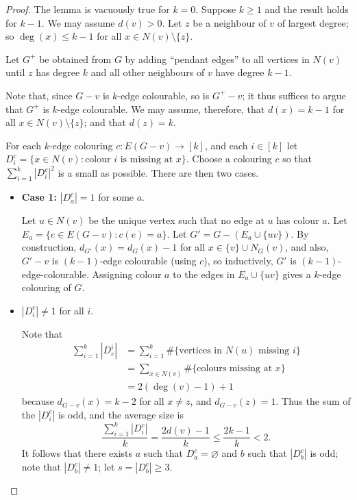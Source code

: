 \documentclass[main.tex]{subfiles}
\begin{document}
\begin{proof}
  The lemma is vacuously true for $k = 0$.
  Suppose $k\geq 1$ and the result holds for $k - 1$.
  We may assume $d(v) > 0$. Let $z$ be a neighbour of $v$ of largest degree;
  so $\deg(x)\leq k-1$ for all $x\in N(v)\setminus\{z\}$.

  Let $G^+$ be obtained from $G$ by adding ``pendant edges'' to all vertices
  in $N(v)$ until $z$ has degree $k$ and all other neighbours of $v$ have degree
  $k-1$.

  Note that, since $G - v$ is $k$-edge colourable, so is $G^+-v$;
  it thus suffices to argue that $G^+$ is $k$-edge colourable.
  We may assume, therefore, that $d(x) = k-1$ for all $x\in N(v)\setminus\{z\}$;
  and that $d(z) = k$.

  For each $k$-edge colouring $c : E(G-v)\to [k]$, and each $i\in[k]$ let
  $D^c_i = \{x\in N(v) : \text{colour }i\text{ is missing at }x\}$.
  Choose a colouring $c$ so that $\sum_{i=1}^k |D_i^c|^2$ is a small as possible.
  There are then two cases.
  \begin{itemize}
    \item \textbf{Case 1:} $|D_a^c| = 1$ for some $a$.

      Let $u\in N(v)$ be the unique vertex such that no edge at $u$ has colour
      $a$.
      Let $E_a = \{e\in E(G - v) : c(e) = a\}$.
      Let $G' = G - (E_a\cup\{uv\})$.
      By construction, $d_{G'}(x) = d_G(x) - 1$ for all $x\in \{v\}\cup N_G(v)$,
      and also, $G' - v$ is $(k-1)$-edge colourable (using $c$), so inductively,
      $G'$ is $(k-1)$-edge-colourable.
      Assigning colour $a$ to the edges in $E_a\cup\{uv\}$ gives a $k$-edge
      colouring of $G$.

    \item $|D_i^c|\neq 1$ for all $i$.

      Note that
      \begin{align*}
        \sum_{i=1}^k |D_c^i|
        &= \sum_{i=1}^k\#\{\text{vertices in }N(u)\text{ missing }i\} \\
        &= \sum_{x\in N(v)}\#\{\text{colours missing at }x\} \\
        &= 2(\deg(v)-1)+1
      \end{align*}
      because $d_{G-v}(x) = k - 2$ for all $x\neq z$, and $d_{G-v}(z) = 1$.
      Thus the sum of the $|D_i^c|$ is odd, and the average size is
      \[
        \frac{\sum_{i=1}^k |D_i^c|}{k} = \frac{2d(v) - 1}{k} \leq\frac{2k-1}{k} < 2.
      \]
      It follows that there exists $a$ such that $D_a^c = \varnothing$ and $b$
      such that $|D^c_b|$ is odd; note that $|D^c_b|\neq 1$;
      let $s = |D_b^c|\geq 3$.


\end{itemize}
\end{proof}
\end{document}
